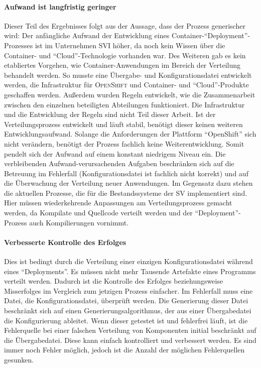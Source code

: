 \paragraph{Aufwand ist langfristig geringer} Dieser Teil des Ergebnisses folgt aus der Aussage, dass der Prozess generischer wird: Der anfängliche Aufwand der Entwicklung eines Container-\enquote{Deployment}-Prozesses ist im Unternehmen \ac{SVI} höher, da noch kein Wissen über die Container- und \enquote{Cloud}-Technologie vorhanden war. Des Weiteren gab es kein etabliertes Vorgehen, wie Container-Anwendungen im Bereich der Verteilung behandelt werden. So musste eine Übergabe- und Konfigurationsdatei entwickelt werden, die Infrastruktur für \textsc{OpenShift} und Container- und \enquote{Cloud}-Produkte geschaffen werden. Außerdem wurden Regeln entwickelt, wie die Zusammenarbeit zwischen den einzelnen beteiligten Abteilungen funktioniert. Die Infrastruktur und die Entwicklung der Regeln sind nicht Teil dieser Arbeit. Ist der Verteilungsprozess entwickelt und läuft stabil, benötigt dieser keinen weiteren Entwicklungsaufwand. Solange die Anforderungen der Plattform \enquote{OpenShift} sich nicht verändern, benötigt der Prozess fachlich keine Weiterentwicklung. Somit pendelt sich der Aufwand auf einem konstant niedrigem Niveau ein. Die verbleibenden Aufwand-verursachenden Aufgaben beschränken sich auf die Betreuung im Fehlerfall (Konfigurationsdatei ist fachlich nicht korrekt) und auf die Überwachung der Verteilung neuer Anwendungen. Im Gegensatz dazu stehen die aktuellen Prozesse, die für die Bestandssysteme der \ac{SV} implementiert sind. Hier müssen wiederkehrende Anpassungen am Verteilungsprozess gemacht werden, da Kompilate und Quellcode verteilt werden und der \enquote{Deployment}-Prozess auch Kompilierungen vornimmt.
 
\paragraph{Verbesserte Kontrolle des Erfolges} Dies ist bedingt durch die Verteilung einer einzigen Konfigurationsdatei während eines \enquote{Deployments}. Es müssen nicht mehr Tausende Artefakte eines Programms verteilt werden. Dadurch ist die Kontrolle des Erfolges beziehungsweise Misserfolges im Vergleich zum jetzigen Prozess einfacher. Im Fehlerfall muss eine Datei, die Konfigurationsdatei, überprüft werden. Die Generierung dieser Datei beschränkt sich auf einen Generierungsalgorithmus, der aus einer Übergabedatei die Konfigurierung ableitet. Wenn dieser getestet ist und fehlerfrei läuft, ist die Fehlerquelle bei einer falschen Verteilung von Komponenten initial beschränkt auf die Übergabedatei. Diese kann einfach kontrolliert und verbessert werden. Es sind immer noch Fehler möglich, jedoch ist die Anzahl der möglichen Fehlerquellen gesunken.

